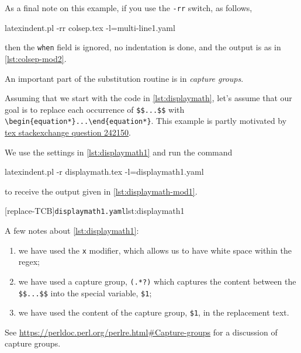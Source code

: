 \documentclass[10pt]{article}
\begin{document}
\begin{example}
 As a final note on this example, if you use the \texttt{-rr} switch, as follows,
  

 \begin{commandshell}
latexindent.pl -rr colsep.tex -l=multi-line1.yaml
\end{commandshell}

 then the \texttt{when} field is ignored, no indentation is done, and the output is as in
 \cref{lst:colsep-mod2}.
 \end{example}

 \begin{example}
 An important part of the substitution routine is in \emph{capture groups}.

 Assuming that we start with the code in \cref{lst:displaymath}, let's assume that our
 goal is to replace each occurrence of \lstinline!$$...$$! with
 \lstinline!\begin{equation*}...\end{equation*}!. This example is partly motivated by
 \href{https://tex.stackexchange.com/questions/242150/good-looking-latex-code}{tex
 stackexchange question 242150}.


 We use the settings in \cref{lst:displaymath1} and run the command  

 \begin{commandshell}
latexindent.pl -r displaymath.tex -l=displaymath1.yaml
\end{commandshell}

 to receive the output given in \cref{lst:displaymath-mod1}. 

 \begin{cmhtcbraster}[raster left skip=-3.75cm,
   raster right skip=-2cm,]
  [replace-TCB]{\texttt{displaymath1.yaml}}{lst:displaymath1}
 \end{cmhtcbraster}

 A few notes about \cref{lst:displaymath1}:
 \begin{enumerate}
  \item we have used the \texttt{x} modifier, which allows us to have white space within
        the regex;
  \item we have used a capture group, \lstinline!(.*?)! which captures the content
        between the \lstinline!$$...$$! into the special variable, \lstinline!$1!;
  \item we have used the content of the capture group, \lstinline!$1!, in the replacement
        text.
 \end{enumerate}
 See
 \href{https://perldoc.perl.org/perlre.html#Capture-groups}{https://perldoc.perl.org/perlre.html\#Capture-groups}
 for a discussion of capture groups.


\end{example}
\end{document}
